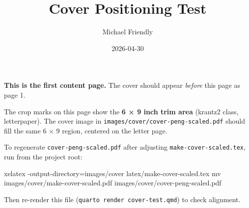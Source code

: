 \documentclass[
  10pt,
  krantz2,
  titlepage,
  letterpaper]{krantz}
\title{Cover Positioning Test}
\author{Michael Friendly}
\date{2026-04-30}
\newenvironment{Shaded}{\begin{snugshade}}{\end{snugshade}}
\newcommand{\AttributeTok}[1]{\textcolor[rgb]{0.40,0.45,0.13}{#1}}
\newcommand{\ExtensionTok}[1]{\textcolor[rgb]{0.00,0.23,0.31}{#1}}
\newcommand{\FunctionTok}[1]{\textcolor[rgb]{0.28,0.35,0.67}{#1}}
\newcommand{\NormalTok}[1]{\textcolor[rgb]{0.00,0.23,0.31}{#1}}
\newcommand{\OperatorTok}[1]{\textcolor[rgb]{0.37,0.37,0.37}{#1}}
\begin{document}
\maketitle


\textbf{This is the first content page.} The cover should appear
\emph{before} this page as page 1.

The crop marks on this page show the \textbf{6 × 9 inch trim area}
(krantz2 class, letterpaper). The cover image in
\texttt{images/cover/cover-peng-scaled.pdf} should fill the same 6 × 9
region, centered on the letter page.

To regenerate \texttt{cover-peng-scaled.pdf} after adjusting
\texttt{make-cover-scaled.tex}, run from the project root:

\begin{Shaded}
\begin{Highlighting}[]
\ExtensionTok{xelatex} \AttributeTok{{-}output{-}directory}\OperatorTok{=}\NormalTok{images/cover latex/make{-}cover{-}scaled.tex}
\FunctionTok{mv}\NormalTok{ images/cover/make{-}cover{-}scaled.pdf images/cover/cover{-}peng{-}scaled.pdf}
\end{Highlighting}
\end{Shaded}

Then re-render this file (\texttt{quarto\ render\ cover-test.qmd}) to
check alignment.
\end{document}
